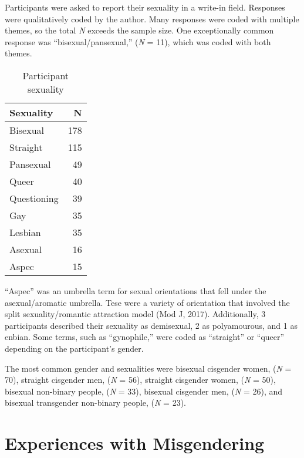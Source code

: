 \documentclass[12pt,twoside]{reedthesis}
\begin{document}
Participants were asked to report their sexuality in a write-in field. Responses were qualitatively coded by the author. Many responses were coded with multiple themes, so the total \emph{N} exceeds the sample size. One exceptionally common response was ``bisexual/pansexual,'' (\emph{N} = 11), which was coded with both themes.
\begin{longtable}[t]{lr}
\caption{\label{tab:unnamed-chunk-4}Participant sexuality}\\
\toprule
Sexuality & N\\
\midrule
Bisexual & 178\\
Straight & 115\\
Pansexual & 49\\
Queer & 40\\
Questioning & 39\\
\addlinespace
Gay & 35\\
Lesbian & 35\\
Asexual & 16\\
Aspec & 15\\
\bottomrule
\end{longtable}
``Aspec'' was an umbrella term for sexual orientations that fell under the asexual/aromatic umbrella. Tese were a variety of orientation that involved the split sexuality/romantic attraction model (Mod J, 2017). Additionally, 3 participants described their sexuality as demisexual, 2 as polyamourous, and 1 as enbian. Some terms, such as ``gynophile,'' were coded as ``straight'' or ``queer'' depending on the participant's gender.

The most common gender and sexualities were bisexual cisgender women, (\emph{N} = 70), straight cisgender men, (\emph{N} = 56), straight cisgender women, (\emph{N} = 50), bisexual non-binary people, (\emph{N} = 33), bisexual cisgender men, (\emph{N} = 26), and bisexual transgender non-binary people, (\emph{N} = 23).

\hypertarget{experiences-with-misgendering}{%
\section{Experiences with Misgendering}\label{experiences-with-misgendering}}
\end{document}
